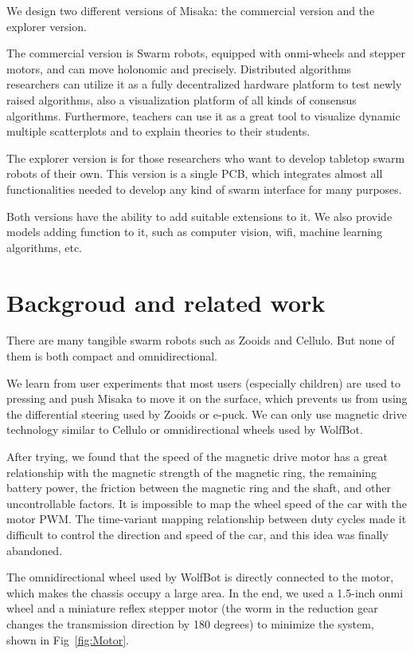 \documentclass[sigconf]{acmart}
\begin{document}
We design two different versions of Misaka: the commercial version and the explorer version. 

The commercial version is Swarm robots, equipped with onmi-wheels and stepper motors, and can move holonomic and precisely. Distributed algorithms researchers can utilize it as a fully decentralized hardware platform to test newly raised algorithms, also a visualization platform of all kinds of consensus algorithms. Furthermore, teachers can use it as a great tool to visualize dynamic multiple scatterplots and to explain theories to their students. 

The explorer version is for those researchers who want to develop tabletop swarm robots of their own. This version is a single PCB, which integrates almost all functionalities needed to develop any kind of swarm interface for many purposes.

Both versions have the ability to add suitable extensions to it. We also provide models adding function to it, such as computer vision, wifi, machine learning algorithms, etc.

\section{Backgroud and related work}

There are many tangible swarm robots such as Zooids\cite{le2016zooids} and Cellulo\cite{ozgur2017cellulo}. But none of them is both compact and omnidirectional.

We learn from user experiments that most users (especially children) are used to pressing and push Misaka to move it on the surface, which prevents us from using the differential steering used by Zooids\cite{le2016zooids} or e-puck\cite{mondada2009puck}. We can only use magnetic drive technology similar to Cellulo\cite{ozgur2017cellulo} or omnidirectional wheels used by WolfBot\cite{betthauser2014wolfbot}. 

After trying, we found that the speed of the magnetic drive motor has a great relationship with the magnetic strength of the magnetic ring, the remaining battery power, the friction between the magnetic ring and the shaft, and other uncontrollable factors. It is impossible to map the wheel speed of the car with the motor PWM. The time-variant mapping relationship between duty cycles made it difficult to control the direction and speed of the car, and this idea was finally abandoned.

The omnidirectional wheel used by WolfBot is directly connected to the motor, which makes the chassis occupy a large area. In the end, we used a 1.5-inch onmi wheel and a miniature reflex stepper motor (the worm in the reduction gear changes the transmission direction by 180 degrees) to minimize the system, shown in Fig~\ref{fig:Motor}.
\end{document}
